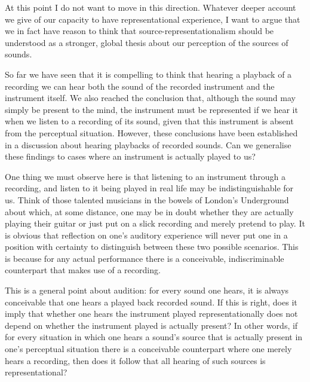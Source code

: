 \documentclass[sloppy, journal, git, bytitle, dodraft]{humapap}
\begin{document}
At this point I do not want to move in this direction. Whatever deeper account we give of our capacity to have representational experience, I want to argue that we in fact have reason to think that source-representationalism should be understood as a stronger, global thesis about our perception of the sources of sounds. 


\sect So far we have seen that it is compelling to think that hearing a playback of a recording we can hear both the sound of the recorded instrument and the instrument itself. We also reached the conclusion that, although the sound may simply be present to the mind, the instrument must be represented if we hear it when we listen to a recording of its sound, given that this instrument is absent from the perceptual situation. However, these conclusions have been established in a discussion about hearing playbacks of recorded sounds. Can we generalise these findings to cases where an instrument is actually played to us? 

One thing we must observe here is that listening to an instrument through a recording, and listen to it being played in real life may be indistinguishable for us. Think of those talented musicians in the bowels of London's Underground about which, at some distance, one may be in doubt whether they are actually playing their guitar or just put on a slick recording and merely pretend to play. It is obvious that reflection on one's auditory experience will never put one in a position with certainty to distinguish between these two possible scenarios. This is because for any actual performance there is a conceivable, indiscriminable counterpart that makes use of a recording. 

This is a general point about audition: for every sound one hears, it is always conceivable that one hears a played back recorded sound. If this is right, does it imply that whether one hears the instrument played representationally does not depend on whether the instrument played is actually present? In other words, if for every situation in which one hears a sound's source that is actually present in one's perceptual situation there is a conceivable counterpart where one merely hears a recording, then does it follow that all hearing of such sources is representational? 
\end{document}
